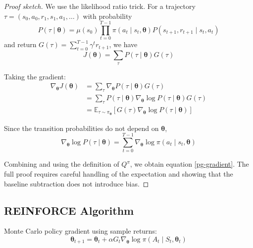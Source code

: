 \documentclass[a4paper, 11pt]{article}
\numberwithin{equation}{section}
\theoremstyle{plain}
\theoremstyle{definition}
\newcommand{\E}{{\mathbb E}}
\newcommand{\1}{{\mathbbm 1}}
\begin{document}
	\begin{proof}[Proof sketch]
		We use the likelihood ratio trick. For a trajectory $\tau = (s_0, a_0, r_1, s_1, a_1, \ldots)$ with probability
		\begin{equation*}
			P(\tau\;|\; \boldsymbol{\theta}) = \mu(s_0) \prod_{t=0}^{T-1} \pi(a_t\;|\; s_t, \boldsymbol{\theta}) P(s_{t+1}, r_{t+1}\;|\; s_t, a_t)
		\end{equation*}
		and return $G(\tau) = \sum_{t=0}^{T-1} \gamma^t r_{t+1}$, we have
		\begin{equation*}
			J(\boldsymbol{\theta}) = \sum_{\tau} P(\tau\;|\; \boldsymbol{\theta}) G(\tau)
		\end{equation*}
		
		Taking the gradient:
		\begin{equation*}
			\begin{split}
				\nabla_{\boldsymbol{\theta}} J(\boldsymbol{\theta}) &= \sum_{\tau} \nabla_{\boldsymbol{\theta}} P(\tau\;|\; \boldsymbol{\theta}) G(\tau)\\
				&= \sum_{\tau} P(\tau\;|\; \boldsymbol{\theta}) \nabla_{\boldsymbol{\theta}} \log P(\tau\;|\; \boldsymbol{\theta}) G(\tau)\\
				&= \E_{\tau \sim \pi_{\boldsymbol{\theta}}} \left[ G(\tau) \nabla_{\boldsymbol{\theta}} \log P(\tau\;|\; \boldsymbol{\theta}) \right]
			\end{split}
		\end{equation*}
		
		Since the transition probabilities do not depend on $\boldsymbol{\theta}$,
		\begin{equation*}
			\nabla_{\boldsymbol{\theta}} \log P(\tau\;|\; \boldsymbol{\theta}) = \sum_{t=0}^{T-1} \nabla_{\boldsymbol{\theta}} \log \pi(a_t\;|\; s_t, \boldsymbol{\theta})
		\end{equation*}
		
		Combining and using the definition of $Q^{\pi}$, we obtain equation \eqref{pg-gradient}. The full proof requires careful handling of the expectation and showing that the baseline subtraction does not introduce bias.
	\end{proof}
	
	\subsection{REINFORCE Algorithm}
	
	Monte Carlo policy gradient using sample returns:
	\begin{equation}\label{reinforce}
		\boldsymbol{\theta}_{t+1} = \boldsymbol{\theta}_t + \alpha G_t \nabla_{\boldsymbol{\theta}} \log \pi(A_t\;|\; S_t, \boldsymbol{\theta}_t)
	\end{equation}
	
\end{document}
